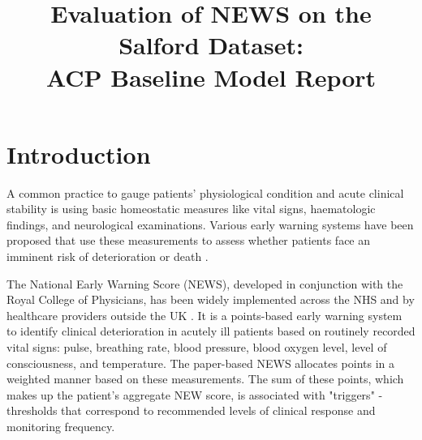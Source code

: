 \documentclass[10pt,journal, compsoc]{IEEEtran}
\begin{document}
\title{Evaluation of NEWS on the Salford Dataset:\\
{ACP Baseline Model Report}
}
\author{}

\maketitle


\section{Introduction}
A common practice to gauge patients' physiological condition and acute clinical stability is using basic homeostatic measures like vital signs, haematologic findings, and neurological examinations. Various early warning systems have been proposed that use these measurements to assess whether patients face an imminent risk of deterioration or death \cite{Smith13}.

The National Early Warning Score (NEWS), developed in conjunction with the Royal College of Physicians, has been widely implemented across the NHS and by healthcare providers outside the UK \cite[pp.~13]{RCP17}. It is a points-based early warning system to identify clinical deterioration in acutely ill patients based on routinely recorded vital signs: pulse, breathing rate, blood pressure, blood oxygen level, level of consciousness, and temperature. The paper-based NEWS allocates points in a weighted manner based on these measurements. The sum of these points, which makes up the patient's aggregate NEW score, is associated with "triggers" - thresholds that correspond to recommended levels of clinical response and monitoring frequency.
\end{document}
